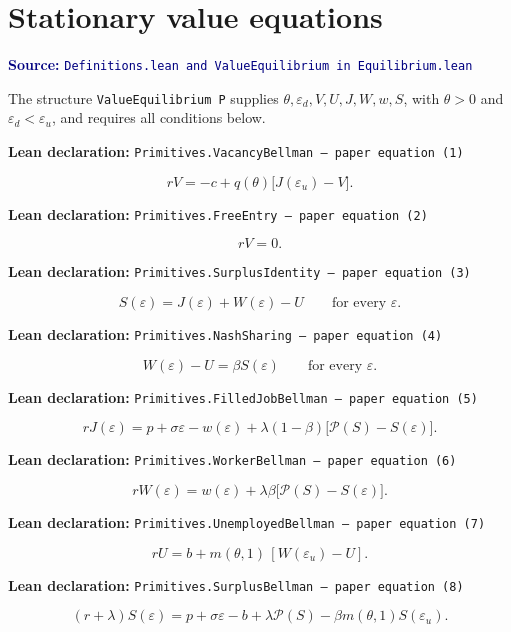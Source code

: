 \documentclass[11pt]{article}
\newcommand{\code}[1]{\texttt{#1}}
\newcommand{\leanfile}[1]{\texttt{#1}}
\newcommand{\epsd}{\varepsilon_d}
\newcommand{\epsu}{\varepsilon_u}
\newcommand{\mworker}[1]{m(#1,1)}
\newcommand{\decl}[1]{\par\smallskip\noindent\colorbox{softblue}{\parbox{0.965\linewidth}{\textbf{Lean declaration:} \code{#1}}}\par\smallskip}
\newcommand{\source}[1]{\textcolor{navy}{\small\textbf{Source:} \leanfile{#1}}}
\begin{document}
\section{Stationary value equations}

\source{Definitions.lean and ValueEquilibrium in Equilibrium.lean}

The structure \code{ValueEquilibrium P} supplies
$\theta,\epsd,V,U,J,W,w,S$, with $\theta>0$ and $\epsd<\epsu$, and requires all
conditions below.

\decl{Primitives.VacancyBellman --- paper equation (1)}
\begin{equation}
rV=-c+q(\theta)\bigl[J(\epsu)-V\bigr]. \tag{1}
\end{equation}

\decl{Primitives.FreeEntry --- paper equation (2)}
\begin{equation}
rV=0. \tag{2}
\end{equation}

\decl{Primitives.SurplusIdentity --- paper equation (3)}
\begin{equation}
S(\varepsilon)=J(\varepsilon)+W(\varepsilon)-U
\qquad\text{for every }\varepsilon. \tag{3}
\end{equation}

\decl{Primitives.NashSharing --- paper equation (4)}
\begin{equation}
W(\varepsilon)-U=\beta S(\varepsilon)
\qquad\text{for every }\varepsilon. \tag{4}
\end{equation}

\decl{Primitives.FilledJobBellman --- paper equation (5)}
\begin{equation}
rJ(\varepsilon)=p+\sigma\varepsilon-w(\varepsilon)
+\lambda(1-\beta)\bigl[\mathcal P(S)-S(\varepsilon)\bigr]. \tag{5}
\end{equation}

\decl{Primitives.WorkerBellman --- paper equation (6)}
\begin{equation}
rW(\varepsilon)=w(\varepsilon)
+\lambda\beta\bigl[\mathcal P(S)-S(\varepsilon)\bigr]. \tag{6}
\end{equation}

\decl{Primitives.UnemployedBellman --- paper equation (7)}
\begin{equation}
rU=b+\mworker{\theta}\,[W(\epsu)-U]. \tag{7}
\end{equation}

\decl{Primitives.SurplusBellman --- paper equation (8)}
\begin{equation}
(r+\lambda)S(\varepsilon)
=p+\sigma\varepsilon-b+\lambda\mathcal P(S)
-\beta\mworker{\theta}S(\epsu). \tag{8}
\end{equation}
\end{document}
